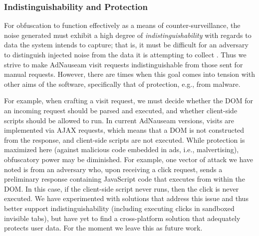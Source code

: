 \documentclass[conference]{IEEEtran}
\begin{document}
\subsubsection{Indistinguishability and Protection}

For obfuscation to function effectively as a means of counter-surveillance, the noise generated must exhibit a high degree of \emph{indistinguishability} with regards to data the system intends to capture; that is, it must be difficult for an adversary to distinguish injected noise from the data it is attempting to collect \cite{Gervais,Balsa}.
Thus we strive to make AdNauseam visit requests indistinguishable from those sent for manual requests. However, there are times when this goal comes into tension with other aims of the software, specifically that of protection, e.g., from malware.

For example, when crafting a visit request, we must decide whether the DOM for an incoming request should be parsed and executed, and whether client-side scripts should be allowed to run. In current AdNauseam versions, visits are implemented via AJAX requests, which means that a DOM is not constructed from the response, and client-side scripts are not executed. While protection is maximized here (against malicious code embedded in ads, i.e., malvertising), obfuscatory power may be diminished. For example, one vector of attack we have noted is from an adversary who, upon receiving a click request, sends a preliminary response containing JavaScript code that executes from within the DOM. In this case, if the client-side script never runs, then the click is never executed. We have experimented with solutions that address this issue and thus better support indistinguishability (including executing clicks in sandboxed invisible tabs), but have yet to find a cross-platform solution that adequately protects user data. For the moment we leave this as future work.

\end{document}
